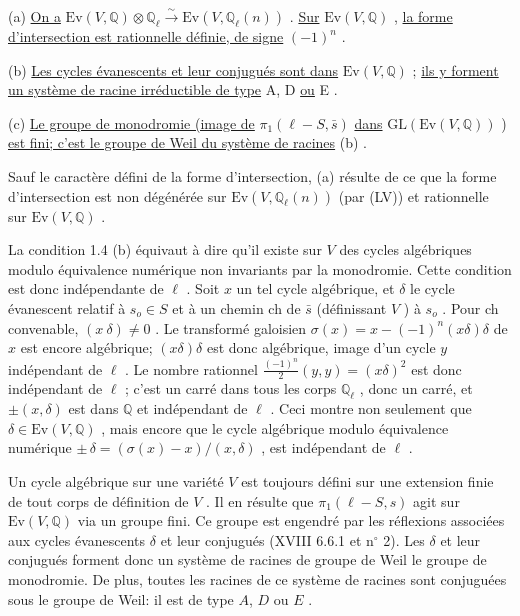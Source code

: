 (a) \underline{On a} $\mathrm{Ev}(V, \mathbb{Q}) \otimes \mathbb{Q}_\ell \stackrel{\sim}{\longrightarrow} \mathrm{Ev}(V, \mathbb{Q}_\ell(n))$ . \underline{Sur} $\mathrm{Ev}(V, \mathbb{Q})$ , \underline{la forme d'intersection est rationnelle définie, de signe} $(-1)^n$ .

(b) \underline{Les cycles évanescents et leur conjugués sont dans} $\mathrm{Ev}(V, \mathbb{Q})$ ; \underline{ils y forment un système de racine irréductible de type} A, D \underline{ou} E .

(c) \underline{Le groupe de monodromie (image de} $\pi_1(\ell - S, \bar{s})$ \underline{dans} $\mathrm{GL}(\mathrm{Ev}(V, \mathbb{Q}))$ ) \underline{est fini; c'est le groupe de Weil du système de racines} (b) .

Sauf le caractère défini de la forme d'intersection, (a) résulte de ce que la forme d'intersection est non dégénérée sur $\mathrm{Ev}(V, \mathbb{Q}_\ell(n))$ (par (LV)) et rationnelle sur $\mathrm{Ev}(V, \mathbb{Q})$ .

La condition 1.4 (b) équivaut à dire qu'il existe sur $V$ des cycles algébriques modulo équivalence numérique non invariants par la monodromie. Cette condition est donc indépendante de $\ell$ . Soit $x$ un tel cycle algébrique, et $\delta$ le cycle évanescent relatif à $s_o \in S$ et à un chemin ch de $\bar{s}$ (définissant $V$ ) à $s_o$ . Pour ch convenable, $(x\ \delta) \neq 0$ . Le transformé galoisien $\sigma(x) = x-(-1)^n(x\delta)\delta$ de $x$ est encore algébrique; $(x\delta)\delta$ est donc algébrique, image d'un cycle $y$ indépendant de $\ell$ . Le nombre rationnel $\frac{(-1)^n}{2}(y, y) = (x\delta)^2$ est donc indépendant de $\ell$ ; c'est un carré dans tous les corps $\mathbb{Q}_\ell$ , donc un carré, et $\pm (x, \delta)$ est dans $\mathbb{Q}$ et indépendant de $\ell$ . Ceci montre non seulement que $\delta \in \mathrm{Ev}(V, \mathbb{Q})$ , mais encore que le cycle algébrique modulo équivalence numérique $\pm\, \delta = (\sigma(x) -x)/(x, \delta)$ , est indépendant de $\ell$ .



Un cycle algébrique sur une variété $V$ est toujours défini sur une extension finie de tout corps de définition de $V$ . Il en résulte que $\pi_1(\ell - S, s)$ agit sur $\mathrm{Ev}(V, \mathbb{Q})$ via un groupe fini. Ce groupe est engendré par les réflexions associées aux cycles évanescents $\delta$ et leur conjugués (XVIII 6.6.1 et n$^\circ$ 2). Les $\delta$ et leur conjugués forment donc un système de racines de groupe de Weil le groupe de monodromie. De plus, toutes les racines de ce système de racines sont conjuguées sous le groupe de Weil: il est de type $A$, $D$ ou $E$ .

